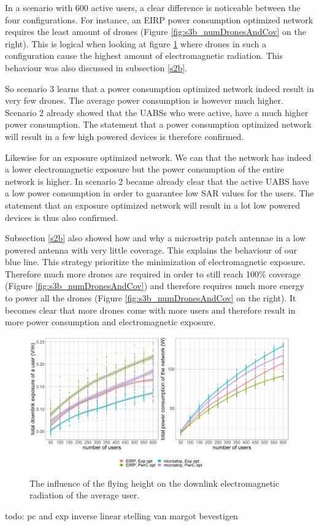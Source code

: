 In a scenario with 600 active users, a clear difference is noticeable between the four configurations. 
For instance, an EIRP power consumption optimized 
network requires the least amount of drones (Figure \ref{fig:s3b_numDronesAndCov} on the right). This is logical when looking at figure \ref{fig:s3b_dlAndPC} where drones in such a configuration cause the highest amount of 
electromagnetic radiation. This behaviour was also discussed in subsection \ref{s2b}. 

So scenario 3 learns that a power consumption optimized network indeed result in very few drones. The average power consumption 
is however much higher. Scenario 2 already showed that the \gls{UABS}s who were active, have a much higher power consumption.
The statement that a power consumption optimized network will result in a few high powered devices is therefore confirmed.

Likewise for an exposure optimized network. We can that the network has indeed a lower electromagnetic exposure but the power consumption 
of the entire network is higher. In scenario 2 became already clear that the active \gls{UABS} have a low power consumption in order to 
guarantee low \gls{SAR} values for the users.  The statement that an exposure optimized network will result in a lot low powered devices is thus also confirmed.

Subsection \ref{s2b} also showed how and why a microstrip patch antennae in a low powered antenna with very little coverage. This 
explains the behaviour of our blue line. This strategy prioritize the minimization of electromagnetic exposure. Therefore much more 
drones are required in order to still reach 100\% coverage (Figure \ref{fig:s3b_numDronesAndCov}) and therefore requires much more energy 
to power all the drones (Figure \ref{fig:s3b_numDronesAndCov} on the right).
It becomes clear that more drones come with more users  and therefore result in more power consumption and electromagnetic exposure.


\begin{figure}[h!]
  \includegraphics[width=\textwidth]{../results/s3/uvsdlAndPc.png}
  \caption{The influence of the flying height on the downlink electromagnetic radiation of the average user.}
  \label{fig:s3b_dlAndPC}
\end{figure}
todo: pc and exp inverse linear stelling van margot bevestigen

